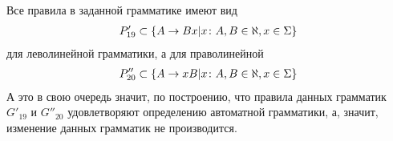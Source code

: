 Все правила в заданной грамматике имеют вид
\begin{align*}
	P'_{19} \subset \left\{A\to Bx|x \colon A, B \in \aleph, x \in \Sigma\right\}
\end{align*}
для леволинейной грамматики, а для праволинейной
\begin{align*}
	P''_{20} \subset \left\{A\to xB|x \colon A, B \in \aleph, x \in \Sigma\right\}
\end{align*}
А это в свою очередь значит, по построению, что правила данных грамматик \(G'_{19}\) и \(G''_{20}\) удовлетворяют определению автоматной грамматики, а, значит, изменение данных грамматик не производится.
